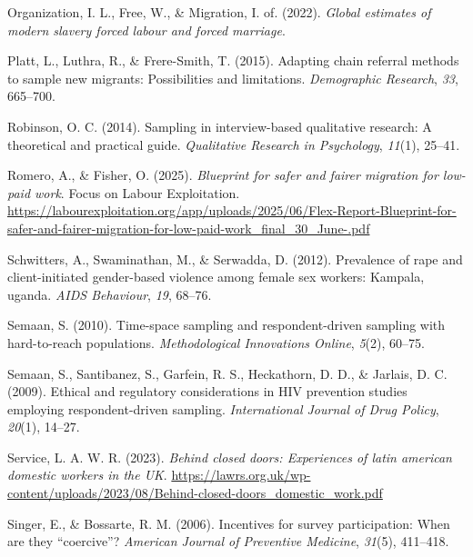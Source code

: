 \documentclass[
  12pt,
]{article}
\newlength{\cslhangindent}
\newenvironment{CSLReferences}[2] %
 {\begin{list}{}{%
  \setlength{\itemindent}{0pt}
  \setlength{\leftmargin}{0pt}
  \setlength{\parsep}{0pt}
  \ifodd #1
   \setlength{\leftmargin}{\cslhangindent}
   \setlength{\itemindent}{-1\cslhangindent}
  \fi
  \setlength{\itemsep}{#2\baselineskip}}}
 {\end{list}}
\theoremstyle{plain}
\theoremstyle{definition}
\begin{document}
\begin{CSLReferences}{1}{0}
Organization, I. L., Free, W., \& Migration, I. of. (2022). \emph{Global
estimates of modern slavery forced labour and forced marriage}.

Platt, L., Luthra, R., \& Frere-Smith, T. (2015). Adapting chain
referral methods to sample new migrants: Possibilities and limitations.
\emph{Demographic Research}, \emph{33}, 665--700.

Robinson, O. C. (2014). Sampling in interview-based qualitative
research: A theoretical and practical guide. \emph{Qualitative Research
in Psychology}, \emph{11}(1), 25--41.

Romero, A., \& Fisher, O. (2025). \emph{Blueprint for safer and fairer
migration for low-paid work}. Focus on Labour Exploitation.
\url{https://labourexploitation.org/app/uploads/2025/06/Flex-Report-Blueprint-for-safer-and-fairer-migration-for-low-paid-work_final_30_June-.pdf}

Schwitters, A., Swaminathan, M., \& Serwadda, D. (2012). Prevalence of
rape and client-initiated gender-based violence among female sex
workers: Kampala, uganda. \emph{{AIDS} Behaviour}, \emph{19}, 68--76.

Semaan, S. (2010). Time-space sampling and respondent-driven sampling
with hard-to-reach populations. \emph{Methodological Innovations
Online}, \emph{5}(2), 60--75.

Semaan, S., Santibanez, S., Garfein, R. S., Heckathorn, D. D., \&
Jarlais, D. C. (2009). Ethical and regulatory considerations in {HIV}
prevention studies employing respondent-driven sampling.
\emph{International Journal of Drug Policy}, \emph{20}(1), 14--27.

Service, L. A. W. R. (2023). \emph{Behind closed doors: Experiences of
latin american domestic workers in the {UK}}.
\url{https://lawrs.org.uk/wp-content/uploads/2023/08/Behind-closed-doors_domestic_work.pdf}

Singer, E., \& Bossarte, R. M. (2006). Incentives for survey
participation: When are they {``coercive''}? \emph{American Journal of
Preventive Medicine}, \emph{31}(5), 411--418.


\end{CSLReferences}
\end{document}
